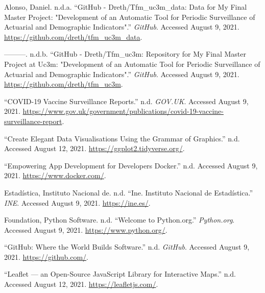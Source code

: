 \documentclass[
  a4paper]{article}
\newlength{\cslhangindent}
\newenvironment{CSLReferences}[2] %
 {%
  \setlength{\parindent}{0pt}
  \ifodd #1 \everypar{\setlength{\hangindent}{\cslhangindent}}\ignorespaces\fi
  \ifnum #2 > 0
  \setlength{\parskip}{#2\baselineskip}
  \fi
 }%
 {}
\begin{document}
\hypertarget{refs}{}
\begin{CSLReferences}{1}{0}
\leavevmode{}%
Alonso, Daniel. n.d.a. {``{GitHub} - Dreth/Tfm\_uc3m\_data: {Data} for
My Final Master Project: "{Development} of an Automatic Tool for
Periodic Surveillance of Actuarial and Demographic Indicators".''}
\emph{GitHub}. Accessed August 9, 2021.
\url{https://github.com/dreth/tfm_uc3m_data}.

\leavevmode{}%
---------. n.d.b. {``{GitHub} - Dreth/Tfm\_uc3m: {Repository} for My
Final Master Project at {Uc3m}: "{Development} of an Automatic Tool for
Periodic Surveillance of Actuarial and Demographic Indicators".''}
\emph{GitHub}. Accessed August 9, 2021.
\url{https://github.com/dreth/tfm_uc3m}.

\leavevmode{}%
{``{COVID}-19 Vaccine Surveillance Reports.''} n.d. \emph{GOV.UK}.
Accessed August 9, 2021.
\url{https://www.gov.uk/government/publications/covid-19-vaccine-surveillance-report}.

\leavevmode{}%
{``Create {Elegant} {Data} {Visualisations} {Using} the {Grammar} of
{Graphics}.''} n.d. Accessed August 12, 2021.
\url{https://ggplot2.tidyverse.org/}.

\leavevmode{}%
{``Empowering App Development for Developers {\textbar} Docker.''} n.d.
Accessed August 9, 2021. \url{https://www.docker.com/}.

\leavevmode{}%
Estadística, Instituto Nacional de. n.d. {``Ine. {Instituto} Nacional de
Estadística.''} \emph{INE}. Accessed August 9, 2021.
\url{https://ine.es/}.

\leavevmode{}%
Foundation, Python Software. n.d. {``Welcome to {Python}.org.''}
\emph{Python.org}. Accessed August 9, 2021.
\url{https://www.python.org/}.

\leavevmode{}%
{``{GitHub}: {Where} the World Builds Software.''} n.d. \emph{GitHub}.
Accessed August 9, 2021. \url{https://github.com/}.

\leavevmode{}%
{``Leaflet --- an Open-Source {JavaScript} Library for Interactive
Maps.''} n.d. Accessed August 12, 2021. \url{https://leafletjs.com/}.


\end{CSLReferences}
\end{document}
